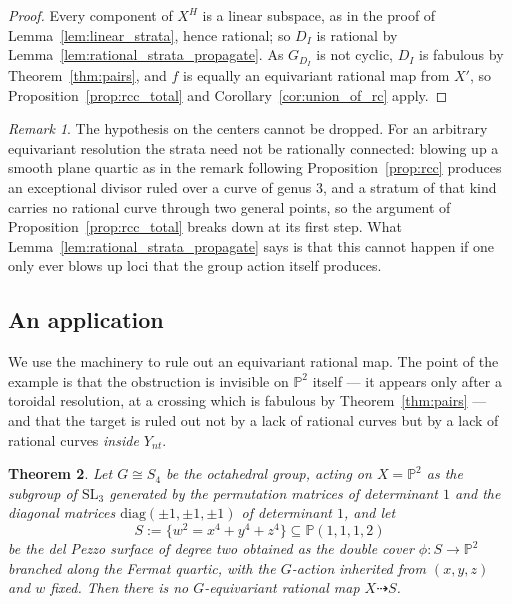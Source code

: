 \documentclass[11pt]{amsart}
\theoremstyle{plain}
\newtheorem{theorem}{Theorem}[section]
\theoremstyle{definition}
\theoremstyle{remark}
\newtheorem{remark}[theorem]{Remark}
\numberwithin{equation}{section}
\begin{document}
\begin{proof}
Every component of $X^H$ is a linear subspace, as in the proof of
Lemma~\ref{lem:linear_strata}, hence rational; so $D_I$ is rational by
Lemma~\ref{lem:rational_strata_propagate}.  As $G_{D_I}$ is not cyclic,
$D_I$ is fabulous by Theorem~\ref{thm:pairs}, and $f$ is equally an
equivariant rational map from $X'$, so
Proposition~\ref{prop:rcc_total} and Corollary~\ref{cor:union_of_rc}
apply.
\end{proof}

\begin{remark}
The hypothesis on the centers cannot be dropped.  For an arbitrary
equivariant resolution the strata need not be rationally connected: blowing
up a smooth plane quartic as in the remark following
Proposition~\ref{prop:rcc} produces an exceptional divisor ruled over a
curve of genus $3$, and a stratum of that kind carries no rational curve
through two general points, so the argument of
Proposition~\ref{prop:rcc_total} breaks down at its first step.  What
Lemma~\ref{lem:rational_strata_propagate} says is that this cannot happen
if one only ever blows up loci that the group action itself produces.
\end{remark}

\subsection*{An application}

We use the machinery to rule out an equivariant rational map.  The point of
the example is that the obstruction is invisible on $\mathbb{P}^2$ itself
--- it appears only after a toroidal resolution, at a crossing which is
fabulous by Theorem~\ref{thm:pairs} --- and that the target is ruled out
not by a lack of rational curves but by a lack of rational curves
\emph{inside $Y_{nt}$}.

\begin{theorem} \label{thm:no_map_to_dp2}
Let $G \cong S_4$ be the octahedral group, acting on $X = \mathbb{P}^2$ as
the subgroup of $\mathrm{SL}_3$ generated by the permutation matrices of
determinant $1$ and the diagonal matrices $\mathrm{diag}(\pm1,\pm1,\pm1)$
of determinant $1$, and let
\[
S := \{ w^2 = x^4 + y^4 + z^4 \} \subseteq \mathbb{P}(1,1,1,2)
\]
be the del Pezzo surface of degree two obtained as the double cover
$\phi : S \to \mathbb{P}^2$ branched along the Fermat quartic, with the
$G$-action inherited from $(x,y,z)$ and $w$ fixed.  Then there is no
$G$-equivariant rational map $X \dasharrow S$.
\end{theorem}
\end{document}
